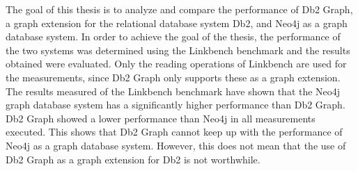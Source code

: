 The goal of this thesis is to analyze and compare the performance of Db2 Graph, a graph extension for the relational database system Db2, and Neo4j as a graph database system. In order to achieve the goal of the thesis, the performance of the two systems was determined using the Linkbench benchmark and the results obtained were evaluated. Only the reading operations of Linkbench are used for the measurements, since Db2 Graph only supports these as a graph extension. The results measured of the Linkbench benchmark have shown that the Neo4j graph database system has a significantly higher performance than Db2 Graph. Db2 Graph showed a lower performance than Neo4j in all measurements executed. This shows that Db2 Graph cannot keep up with the performance of Neo4j as a graph database system. However, this does not mean that the use of Db2 Graph as a graph extension for Db2 is not worthwhile. 